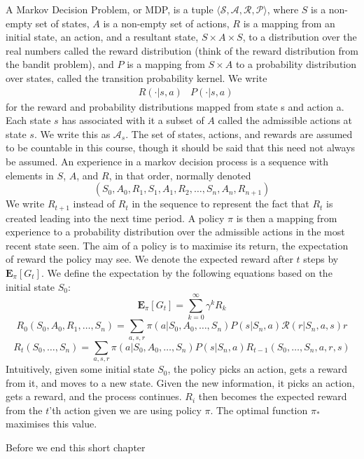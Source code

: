 \documentclass{report}
\begin{document}
A Markov Decision Problem, or MDP, is a tuple $\langle \mathcal{S}, \mathcal{A}, \mathcal{R}, \mathcal{P} \rangle$, where $S$ is a non-empty set of states, $A$ is a non-empty set of actions, $R$ is a mapping from an initial state, an action, and a resultant state, $S \times A \times S$, to a distribution over the real numbers called the reward distribution (think of the reward distribution from the bandit problem), and $P$ is a mapping from $S \times A$ to a probability distribution over states, called the transition probability kernel. We write
%
\begin{align*} &R(\cdotp | s, a) &P(\cdotp | s,a) \end{align*}
%
for the reward and probability distributions mapped from state s and action a. Each state $s$ has associated with it a subset of $A$ called the admissible actions at state $s$. We write this as $\mathcal{A}_s$. The set of states, actions, and rewards are assumed to be countable in this course, though it should be said that this need not always be assumed. An experience in a markov decision process is a sequence with elements in $S$, $A$, and $R$, in that order, normally denoted
%
\[ (S_0, A_0, R_1, S_1, A_1, R_2, \dots, S_n, A_n, R_{n+1}) \]
%
We write $R_{t+1}$ instead of $R_t$ in the sequence to represent the fact that $R_t$ is created leading into the next time period. A policy $\pi$ is then a mapping from experience to a probability distribution over the admissible actions in the most recent state seen. The aim of a policy is to maximise its return, the expectation of reward the policy may see. We denote the expected reward after $t$ steps by $\mathbf{E}_\pi[G_t]$. We define the expectation by the following equations based on the initial state $S_0$:
%
\[ \mathbf{E}_\pi[G_t] = \sum_{k = 0}^{\infty} \gamma^k R_k \]
%
\[ R_0(S_0,A_0,R_1,\dots,S_n) = \sum_{a,s,r}\pi(a|S_0,A_0,\dots,S_n) P(s|S_n,a) \mathcal{R}(r|S_n,a,s)r \]
%
\[ R_t(S_0, \dots, S_n) = \sum_{a,s,r}\pi(a|S_0,A_0,\dots,S_n) P(s|S_n,a) R_{t-1}(S_0, \dots, S_n, a, r, s) \]
%
Intuitively, given some initial state $S_0$, the policy picks an action, gets a reward from it, and moves to a new state. Given the new information, it picks an action, gets a reward, and the process continues. $R_i$ then becomes the expected reward from the $t$'th action given we are using policy $\pi$. The optimal function $\pi_*$ maximises this value.

Before we end this short chapter
\end{document}
